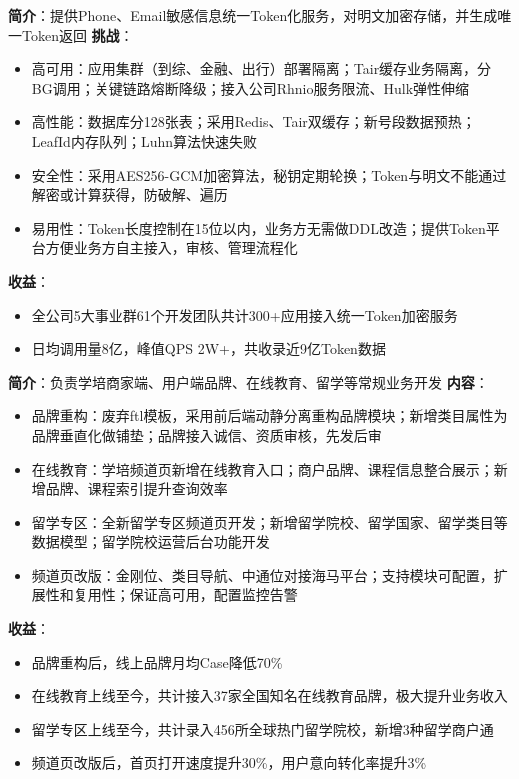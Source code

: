 \documentclass{resume}
\begin{document}
    \begin{onehalfspacing}
        \textbf{简介}：提供Phone、Email敏感信息统一Token化服务，对明文加密存储，并生成唯一Token返回\newline
        \textbf{挑战}：
        \begin{itemize}
            \item 高可用：应用集群（到综、金融、出行）部署隔离；Tair缓存业务隔离，分BG调用；关键链路熔断降级；接入公司Rhnio服务限流、Hulk弹性伸缩
            \item 高性能：数据库分128张表；采用Redis、Tair双缓存；新号段数据预热；LeafId内存队列；Luhn算法快速失败
            \item 安全性：采用AES256-GCM加密算法，秘钥定期轮换；Token与明文不能通过解密或计算获得，防破解、遍历
            \item 易用性：Token长度控制在15位以内，业务方无需做DDL改造；提供Token平台方便业务方自主接入，审核、管理流程化
        \end{itemize}
        \textbf{收益}：
        \begin{itemize}
            \item 全公司5大事业群61个开发团队共计300+应用接入统一Token加密服务
            \item 日均调用量8亿，峰值QPS 2W+，共收录近9亿Token数据
        \end{itemize}
    \end{onehalfspacing}
    \blankline{ }

    \begin{onehalfspacing}
        \textbf{简介}：负责学培商家端、用户端品牌、在线教育、留学等常规业务开发\newline
        \textbf{内容}：
        \begin{itemize}
            \item 品牌重构：废弃ftl模板，采用前后端动静分离重构品牌模块；新增类目属性为品牌垂直化做铺垫；品牌接入诚信、资质审核，先发后审
            \item 在线教育：学培频道页新增在线教育入口；商户品牌、课程信息整合展示；新增品牌、课程索引提升查询效率
            \item 留学专区：全新留学专区频道页开发；新增留学院校、留学国家、留学类目等数据模型；留学院校运营后台功能开发
            \item 频道页改版：金刚位、类目导航、中通位对接海马平台；支持模块可配置，扩展性和复用性；保证高可用，配置监控告警
        \end{itemize}
        \textbf{收益}：
        \begin{itemize}
            \item 品牌重构后，线上品牌月均Case降低70\%
            \item 在线教育上线至今，共计接入37家全国知名在线教育品牌，极大提升业务收入
            \item 留学专区上线至今，共计录入456所全球热门留学院校，新增3种留学商户通
            \item 频道页改版后，首页打开速度提升30\%，用户意向转化率提升3\%
        \end{itemize}
    \end{onehalfspacing}
    \blankline{ }
\end{document}

